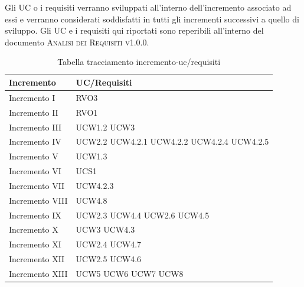 \documentclass[../piano_di_progetto.tex]{subfiles}
\begin{document}
Gli UC o i requisiti verranno sviluppati all'interno dell'incremento associato ad essi e verranno considerati soddisfatti in tutti gli incrementi successivi a quello di sviluppo. Gli UC e i requisiti qui riportati sono reperibili all'interno del documento \textsc{Analisi dei Requisiti v1.0.0}.
\begin{table}[!ht]
	\centering
	\begin{tabular}{|p{3cm}|p{3cm}|}
	\hline
	\rowcolor{lightgray}
	\textbf{Incremento} & \textbf{UC/Requisiti}\\
	\hline
        Incremento I & RVO3\\
        Incremento II & RVO1\\
        Incremento III & UCW1.2  UCW3 \\
        Incremento IV & UCW2.2 UCW4.2.1 UCW4.2.2 UCW4.2.4 UCW4.2.5\\
        Incremento V & UCW1.3\\
        Incremento VI & UCS1\\ %
        Incremento VII & UCW4.2.3\\ %
        Incremento VIII & UCW4.8 \\ %
        Incremento IX & UCW2.3 UCW4.4 UCW2.6  UCW4.5\\ %
        Incremento X & UCW3 UCW4.3\\ %
        Incremento XI & UCW2.4 UCW4.7\\ %
        Incremento XII & UCW2.5 UCW4.6\\ %
        Incremento XIII & UCW5 UCW6 UCW7 UCW8\\ %
        
    \hline	
	\end{tabular}
	\caption{Tabella tracciamento incremento-uc/requisiti}
\end{table}
\end{document}
